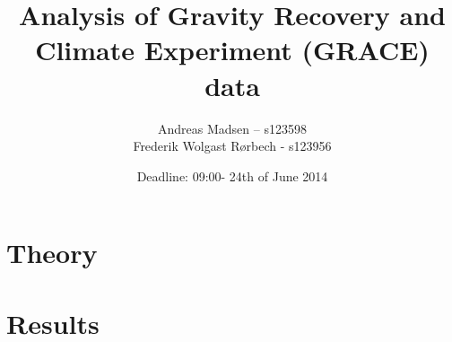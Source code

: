 \documentclass[a4paper]{article}
\numberwithin{equation}{section}
\numberwithin{figure}{section}
\numberwithin{table}{section}
\begin{document}
\title{Analysis of Gravity Recovery and Climate Experiment (GRACE) data}
\author{Andreas Madsen – s123598\\Frederik Wolgast Rørbech - s123956}
\date{Deadline: 09:00- 24th of June 2014}
\maketitle

\setcounter{tocdepth}{2}
\pagebreak
\tableofcontents
\pagebreak





\pagebreak
\section{Theory}












\pagebreak
\section{Results}








\pagebreak

\pagebreak


\pagebreak
\printbibliography
\end{document}
